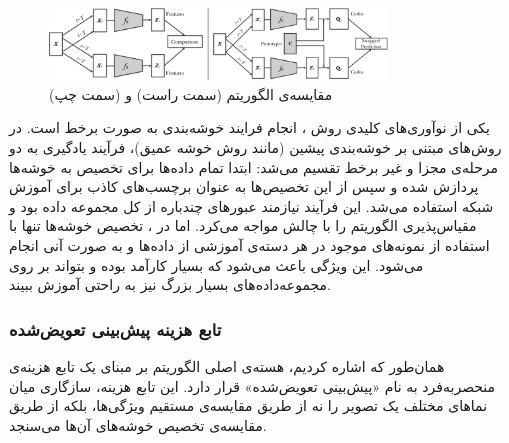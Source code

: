 \begin{figure}[htb!]
\centering
\includegraphics[width=0.8\textwidth]{Images/Chapter3/swav-comparison.png}
\caption{مقایسه‌ی الگوریتم  (سمت راست) و  (سمت چپ)}
\label{fig:wavelet-plot}
\end{figure}

یکی از نوآوری‌های کلیدی روش ، انجام فرایند خوشه‌بندی به صورت برخط
است. در روش‌های مبتنی بر خوشه‌بندی پیشین
(مانند روش خوشه عمیق\cite{caron2018deep})،
فرآیند یادگیری به دو مرحله‌ی مجزا و غیر برخط تقسیم می‌شد: ابتدا تمام داده‌ها برای تخصیص به خوشه‌ها پردازش شده و سپس از این تخصیص‌ها به عنوان برچسب‌های کاذب برای آموزش شبکه استفاده می‌شد.  این فرآیند نیازمند عبورهای چندباره از کل مجموعه داده بود و مقیاس‌پذیری الگوریتم را با چالش مواجه می‌کرد. اما در ، تخصیص خوشه‌ها تنها با استفاده از نمونه‌های موجود در هر دسته‌ی آموزشی از داده‌ها و به صورت آنی انجام می‌شود. این ویژگی باعث می‌شود که  بسیار کارآمد بوده و بتواند بر روی مجموعه‌داده‌های بسیار بزرگ نیز به راحتی آموزش ببیند.

\subsubsection{تابع هزینه پیش‌بینی تعویض‌شده}

همان‌طور که اشاره کردیم، هسته‌ی اصلی الگوریتم  بر مبنای یک تابع هزینه‌ی منحصربه‌فرد به نام «پیش‌بینی تعویض‌شده» قرار دارد. این تابع هزینه، سازگاری میان نماهای مختلف یک تصویر را نه از طریق مقایسه‌ی مستقیم ویژگی‌ها، بلکه از طریق مقایسه‌ی تخصیص خوشه‌های آن‌ها می‌سنجد.


